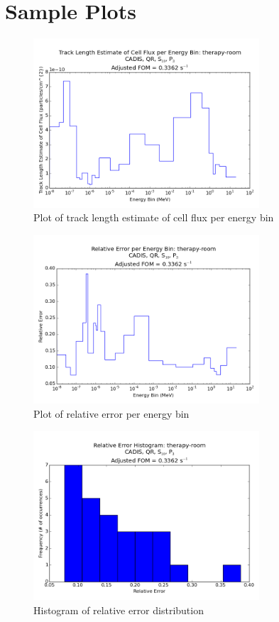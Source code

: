 \documentclass[10pt]{article}
\begin{document}
\section*{Sample Plots}

\begin{figure}[!h]
\centering
\includegraphics[width = 0.75\textwidth]{plot/tally-therapy-room_qr10-3.png}
\caption{Plot of track length estimate of cell flux per energy bin}
\end{figure}

\begin{figure}[!h]
\centering
\includegraphics[width = 0.75\textwidth]{plot/sigma-therapy-room_qr10-3.png}
\caption{Plot of relative error per energy bin}
\end{figure}

\newpage 

\begin{figure}[!h]
\centering
\includegraphics[width = 0.75\textwidth]{plot/hist-therapy-room_qr10-3.png}
\caption{Histogram of relative error distribution}
\end{figure}
\end{document}

